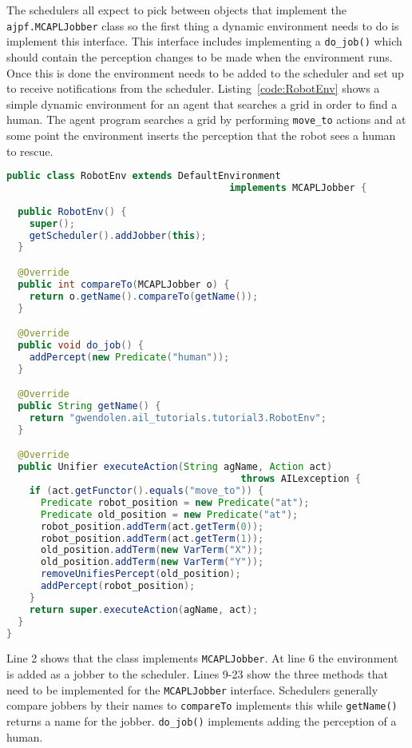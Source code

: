 \documentclass[a4]{article}
\begin{document}
The schedulers all expect to pick between objects that implement the \texttt{ajpf.MCAPLJobber} class so the first thing a dynamic environment needs to do is implement this interface.  This interface includes implementing a \texttt{do\_job()} which should contain the perception changes to be made when the environment runs.  Once this is done the environment needs to be added to the scheduler and set up to receive notifications from the scheduler.  Listing~\ref{code:RobotEnv} shows a simple dynamic environment for an agent that searches a grid in order to find a human.  The agent program searches a grid by performing \lstinline{move_to} actions and at some point the environment inserts the perception that the robot sees a human to rescue.
\begin{lstlisting}[float,caption=RobotEnv,basicstyle=\sffamily,language=Java,style=easslisting,label=code:RobotEnv]
public class RobotEnv extends DefaultEnvironment
                                       implements MCAPLJobber {
	
  public RobotEnv() {
    super();
    getScheduler().addJobber(this);
  }

  @Override
  public int compareTo(MCAPLJobber o) {
    return o.getName().compareTo(getName());
  }

  @Override
  public void do_job() {
    addPercept(new Predicate("human"));
  }

  @Override
  public String getName() {
    return "gwendolen.ail_tutorials.tutorial3.RobotEnv";
  }   

  @Override
  public Unifier executeAction(String agName, Action act) 
                                         throws AILexception {
    if (act.getFunctor().equals("move_to")) {
      Predicate robot_position = new Predicate("at");
      Predicate old_position = new Predicate("at");
      robot_position.addTerm(act.getTerm(0));
      robot_position.addTerm(act.getTerm(1));
      old_position.addTerm(new VarTerm("X"));
      old_position.addTerm(new VarTerm("Y"));
      removeUnifiesPercept(old_position);
      addPercept(robot_position);
    }
    return super.executeAction(agName, act);
  }
}
\end{lstlisting}
Line 2 shows that the class implements \texttt{MCAPLJobber}.  At line 6 the environment is added as a jobber to the scheduler.  Lines 9-23 show the three methods that need to be implemented for the \texttt{MCAPLJobber} interface.  Schedulers generally compare jobbers by their names to \texttt{compareTo} implements this while \texttt{getName()} returns a name for the jobber.  \texttt{do\_job()} implements adding the perception of a human.
\end{document}
